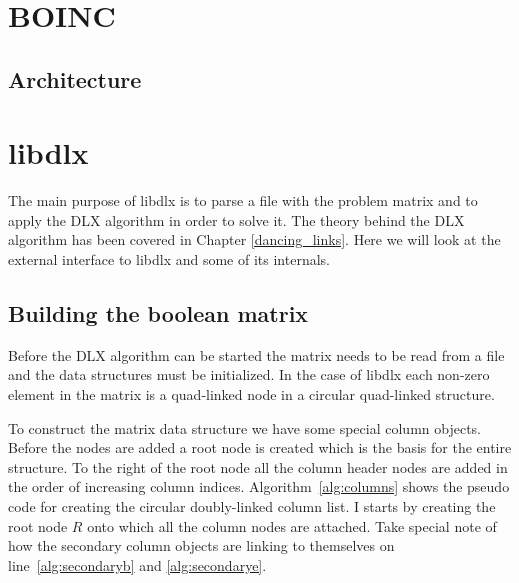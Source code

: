 



\section{BOINC}

\subsection{Architecture}


\section{libdlx}

The main purpose of libdlx is to parse a file with the problem matrix and to apply the DLX algorithm in order to solve it.
The theory behind the DLX algorithm has been covered in Chapter \ref{dancing_links}.
Here we will look at the external interface to libdlx and some of its internals.



\subsection{Building the boolean matrix}
\label{matrix_construction}

Before the DLX algorithm can be started the matrix needs to be read from a file and the data structures must be initialized.
In the case of libdlx each non-zero element in the matrix is a quad-linked node in a circular quad-linked structure.

To construct the matrix data structure we have some special column objects.
Before the nodes are added a root node is created which is the basis for the entire structure.
To the right of the root node all the column header nodes are added in the order of increasing column indices.
Algorithm~\ref{alg:columns} shows the pseudo code for creating the circular doubly-linked column list.
I starts by creating the root node $R$ onto which all the column nodes are attached.
Take special note of how the secondary column objects are linking to themselves on line~\ref{alg:secondaryb} and \ref{alg:secondarye}.

